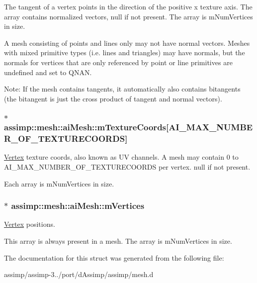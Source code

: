 The tangent of a vertex points in the direction of the positive x texture axis. The array contains normalized vectors, null if not present. The array is {\ttfamily m\+Num\+Vertices} in size.

A mesh consisting of points and lines only may not have normal vectors. Meshes with mixed primitive types (i.\+e. lines and triangles) may have normals, but the normals for vertices that are only referenced by point or line primitives are undefined and set to {\ttfamily Q\+N\+A\+N}.

Note\+: If the mesh contains tangents, it automatically also contains bitangents (the bitangent is just the cross product of tangent and normal vectors). \hypertarget{structassimp_1_1mesh_1_1ai_mesh_a93b9896f1b98b8368cd3c869ea4f2a98}{
\subsubsection[{m\+Texture\+Coords}]{$\ast$ assimp\+::mesh\+::ai\+Mesh\+::m\+Texture\+Coords\mbox{[}{\bf A\+I\+\_\+\+M\+A\+X\+\_\+\+N\+U\+M\+B\+E\+R\+\_\+\+O\+F\+\_\+\+T\+E\+X\+T\+U\+R\+E\+C\+O\+O\+R\+D\+S}\mbox{]}}}\label{structassimp_1_1mesh_1_1ai_mesh_a93b9896f1b98b8368cd3c869ea4f2a98}
\hyperlink{struct_vertex}{Vertex} texture coords, also known as U\+V channels. A mesh may contain 0 to {\ttfamily A\+I\+\_\+\+M\+A\+X\+\_\+\+N\+U\+M\+B\+E\+R\+\_\+\+O\+F\+\_\+\+T\+E\+X\+T\+U\+R\+E\+C\+O\+O\+R\+D\+S} per vertex. null if not present.

Each array is {\ttfamily m\+Num\+Vertices} in size. \hypertarget{structassimp_1_1mesh_1_1ai_mesh_ae32bf7a3f9169463de97bd33622f8272}{
\subsubsection[{m\+Vertices}]{$\ast$ assimp\+::mesh\+::ai\+Mesh\+::m\+Vertices}}\label{structassimp_1_1mesh_1_1ai_mesh_ae32bf7a3f9169463de97bd33622f8272}
\hyperlink{struct_vertex}{Vertex} positions.

This array is always present in a mesh. The array is {\ttfamily m\+Num\+Vertices} in size. 

The documentation for this struct was generated from the following file\+:\begin{DoxyCompactItemize}
\item 
assimp/assimp-\/3../port/d\+Assimp/assimp/mesh.\+d\end{DoxyCompactItemize}
